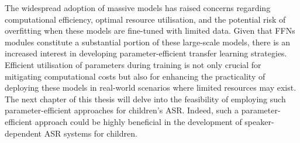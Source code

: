 The widespread adoption of massive models has raised concerns regarding computational efficiency, optimal resource utilisation, and the potential risk of overfitting when these models are fine-tuned with limited data. Given that \ac{FFN}s modules constitute a substantial portion of these large-scale models, there is an increased interest in developing parameter-efficient transfer learning strategies. Efficient utilisation of parameters during training is not only crucial for mitigating computational costs but also for enhancing the practicality of deploying these models in real-world scenarios where limited resources may exist.
The next chapter of this thesis will delve into the feasibility of employing such parameter-efficient approaches for children's \ac{ASR}. Indeed, such a parameter-efficient approach could be highly beneficial in the development of speaker-dependent \ac{ASR} systems for children. 